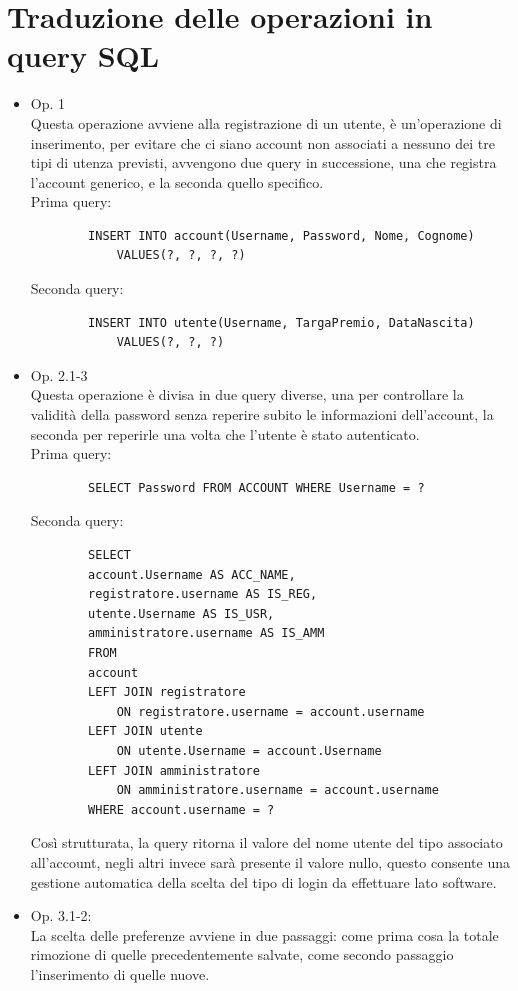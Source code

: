 \documentclass[a4paper,12pt]{report}
\begin{document}
\section{Traduzione delle operazioni in query SQL}
\begin{itemize}
	\item Op. 1 \\
	Questa operazione avviene alla registrazione di un utente, è un'operazione di inserimento, per evitare che ci siano account non associati a nessuno dei tre tipi di utenza previsti, avvengono due query in successione, una che registra l'account generico, e la seconda quello specifico.\\
	Prima query:
	\begin{verbatim}
		INSERT INTO account(Username, Password, Nome, Cognome) 
			VALUES(?, ?, ?, ?)
	\end{verbatim}
	Seconda query:
	\begin{verbatim}
		INSERT INTO utente(Username, TargaPremio, DataNascita)
			VALUES(?, ?, ?)
	\end{verbatim}
	\item Op. 2.1-3 \\ Questa operazione è divisa in due query diverse, una per controllare la validità della password senza reperire subito le informazioni dell'account, la seconda per reperirle una volta che l'utente è stato autenticato.\\
	Prima query:
	\begin{verbatim}
		SELECT Password FROM ACCOUNT WHERE Username = ?
	\end{verbatim}
	Seconda query:
	\begin{verbatim}
		SELECT
		account.Username AS ACC_NAME,
		registratore.username AS IS_REG,
		utente.Username AS IS_USR,
		amministratore.username AS IS_AMM 
		FROM 
		account 
		LEFT JOIN registratore 
			ON registratore.username = account.username 
		LEFT JOIN utente 
			ON utente.Username = account.Username 
		LEFT JOIN amministratore 
			ON amministratore.username = account.username
		WHERE account.username = ?
	\end{verbatim}
	Così strutturata, la query ritorna il valore del nome utente del tipo associato all'account, negli altri invece sarà presente il valore nullo, questo consente una gestione automatica della scelta del tipo di login da effettuare lato software.
	\item Op. 3.1-2: \\
	La scelta delle preferenze avviene in due passaggi: come prima cosa la totale rimozione di quelle precedentemente salvate, come secondo passaggio l'inserimento di quelle nuove.\\

\end{itemize}
\end{document}
